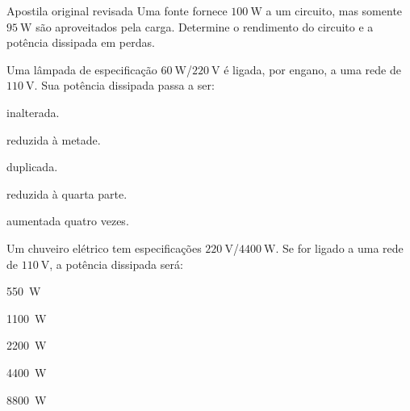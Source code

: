 \begin{questao}[1]{Apostila original revisada}
Uma fonte fornece $\SI{100}{\watt}$ a um circuito, mas somente
$\SI{95}{\watt}$ são aproveitados pela carga. Determine o rendimento do circuito
e a potência dissipada em perdas.
\end{questao}

\blocoaplicacao

\begin{questao}[2]{}
Uma lâmpada de especificação $\SI{60}{\watt}$/$\SI{220}{\volt}$ é ligada, por
engano, a uma rede de $\SI{110}{\volt}$. Sua potência dissipada passa a ser:
\begin{alternativas}
\item inalterada.
\item reduzida à metade.
\item duplicada.
\item reduzida à quarta parte.
\item aumentada quatro vezes.
\end{alternativas}
\end{questao}

\begin{questao}[2]{}
Um chuveiro elétrico tem especificações $\SI{220}{\volt}$/$\SI{4400}{\watt}$. Se
for ligado a uma rede de $\SI{110}{\volt}$, a potência dissipada será:
\begin{alternativas}[2]
\item \SI{550}{\watt}
\item \SI{1100}{\watt}
\item \SI{2200}{\watt}
\item \SI{4400}{\watt}
\item \SI{8800}{\watt}
\end{alternativas}
\end{questao}

